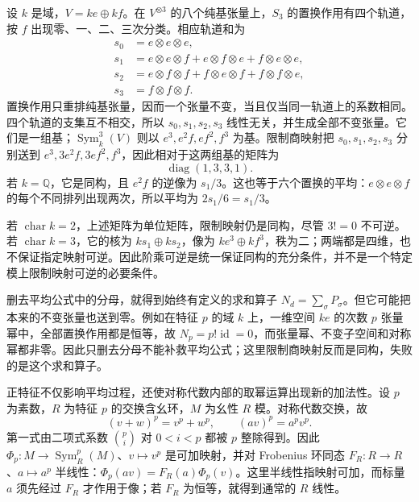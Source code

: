\begin{example}\label{b2:exm:cubic-symmetrization-orbits}
	设 \(k\) 是域，\(V=ke\oplus kf\)。在 \(V^{\otimes3}\) 的八个纯基张量上，\(S_3\) 的置换作用有四个轨道，按 \(f\) 出现零、一、二、三次分类。相应轨道和为
	\[
		\begin{aligned}
			s_0&=e\otimes e\otimes e,\\
			s_1&=e\otimes e\otimes f+e\otimes f\otimes e+f\otimes e\otimes e,\\
			s_2&=e\otimes f\otimes f+f\otimes e\otimes f+f\otimes f\otimes e,\\
			s_3&=f\otimes f\otimes f.
		\end{aligned}
	\]
	置换作用只重排纯基张量，因而一个张量不变，当且仅当同一轨道上的系数相同。四个轨道的支集互不相交，所以 \(s_0,s_1,s_2,s_3\) 线性无关，并生成全部不变张量。它们是一组基；\(\operatorname{Sym}_k^3(V)\) 则以 \(e^3,e^2f,ef^2,f^3\) 为基。限制商映射把 \(s_0,s_1,s_2,s_3\) 分别送到 \(e^3,3e^2f,3ef^2,f^3\)，因此相对于这两组基的矩阵为
	\[
		\operatorname{diag}(1,3,3,1).
	\]
	若 \(k=\mathbb Q\)，它是同构，且 \(e^2f\) 的逆像为 \(s_1/3\)。这也等于六个置换的平均：\(e\otimes e\otimes f\) 的每个不同排列出现两次，所以平均为 \(2s_1/6=s_1/3\)。

	若 \(\operatorname{char}k=2\)，上述矩阵为单位矩阵，限制映射仍是同构，尽管 \(3!=0\) 不可逆。若 \(\operatorname{char}k=3\)，它的核为 \(ks_1\oplus ks_2\)，像为 \(ke^3\oplus kf^3\)，秩为二；两端都是四维，也不保证指定映射可逆。因此阶乘可逆是统一保证同构的充分条件，并不是一个特定模上限制映射可逆的必要条件。
\end{example}

删去平均公式中的分母，就得到始终有定义的求和算子 \(N_d=\sum_\sigma P_\sigma\)。但它可能把本来的不变张量也送到零。例如在特征 \(p\) 的域 \(k\) 上，一维空间 \(ke\) 的次数 \(p\) 张量幂中，全部置换作用都是恒等，故 \(N_p=p!\operatorname{id}=0\)，而张量幂、不变子空间和对称幂都非零。因此只删去分母不能补救平均公式；这里限制商映射反而是同构，失败的是这个求和算子。

\ProseParagraphBreak
正特征不仅影响平均过程，还使对称代数内部的取幂运算出现新的加法性。设 \(p\) 为素数，\(R\) 为特征 \(p\) 的交换含幺环，\(M\) 为幺性 \(R\) 模。对称代数交换，故
\[
	(v+w)^p=v^p+w^p,\qquad (av)^p=a^pv^p.
\]
第一式由二项式系数 \(\binom pi\) 对 \(0<i<p\) 都被 \(p\) 整除得到。因此 \(\Phi_p:M\rightarrow\operatorname{Sym}_R^p(M)\)、\(v\mapsto v^p\) 是可加映射，并对 Frobenius 环同态 \(F_R:R\rightarrow R\)、\(a\mapsto a^p\) 半线性：\(\Phi_p(av)=F_R(a)\Phi_p(v)\)。这里半线性指映射可加，而标量 \(a\) 须先经过 \(F_R\) 才作用于像；若 \(F_R\) 为恒等，就得到通常的 \(R\) 线性。

